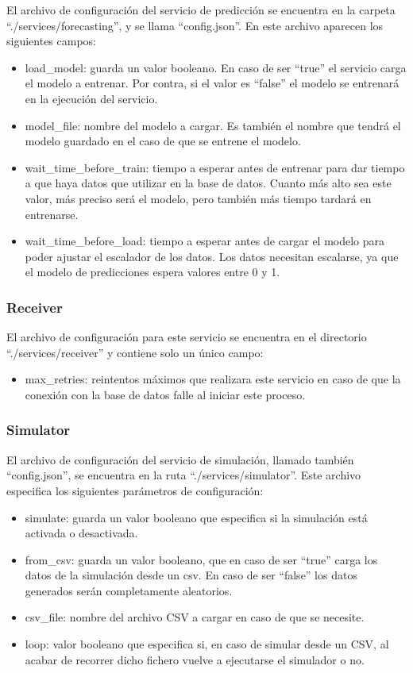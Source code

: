 El archivo de configuración del servicio de predicción se encuentra en la carpeta ``./services/forecasting'', y 
se llama ``config.json''. En este archivo aparecen los siguientes campos:
\begin{itemize}
    \item load\_model: guarda un valor booleano. En caso de ser ``true'' el servicio carga el modelo a entrenar.
        Por contra, si el valor es ``false'' el modelo se entrenará en la ejecución del servicio.
    \item model\_file: nombre del modelo a cargar. Es también el nombre que tendrá el modelo guardado en el caso 
        de que se entrene el modelo.
    \item wait\_time\_before\_train: tiempo a esperar antes de entrenar para dar tiempo a que haya datos que 
        utilizar en la base de datos. Cuanto más alto sea este valor, más preciso será el modelo, pero también
        más tiempo tardará en entrenarse.
    \item wait\_time\_before\_load: tiempo a esperar antes de cargar el modelo para poder ajustar el escalador de los
        datos. Los datos necesitan escalarse, ya que el modelo de predicciones espera valores entre 0 y 1.
\end{itemize}

\subsubsection{Receiver}

El archivo de configuración para este servicio se encuentra en el directorio ``./services/receiver'' y 
contiene solo un único campo:
\begin{itemize}
    \item max\_retries: reintentos máximos que realizara este servicio en caso de que la conexión con 
        la base de datos falle al iniciar este proceso.
\end{itemize}

\subsubsection{Simulator}

El archivo de configuración del servicio de simulación, llamado también ``config.json'', se encuentra en la 
ruta ``./services/simulator''. Este archivo especifica los siguientes parámetros de configuración:
\begin{itemize}
  \item simulate: guarda un valor booleano que especifica si la simulación está activada o desactivada.
  \item from\_csv: guarda un valor booleano, que en caso de ser ``true'' carga los datos de la simulación desde
    un csv. En caso de ser ``false'' los datos generados serán completamente aleatorios.
  \item csv\_file: nombre del archivo CSV a cargar en caso de que se necesite.
  \item loop: valor booleano que especifica si, en caso de simular desde un CSV, al acabar de recorrer dicho fichero 
    vuelve a ejecutarse el simulador o no.
\end{itemize}

